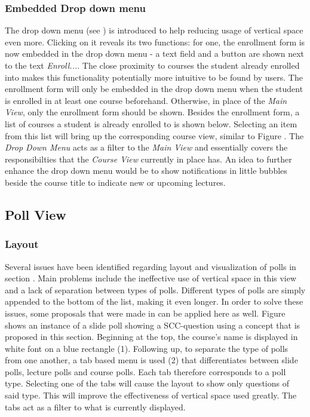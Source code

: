 \subsubsection{Embedded Drop down menu}
\label{section:con:proposals:dropdown}
The drop down menu (see \todogrf) is introduced to help reducing usage of vertical space even more. Clicking on it reveals its two functions: for one, the enrollment form is now embedded in the drop down menu - a text field and a button are shown next to the text \emph{Enroll...}. The close proximity to courses the student already enrolled into makes this functionality potentially more intuitive to be found by users. The enrollment form will only be embedded in the drop down menu when the student is enrolled in at least one course beforehand. Otherwise, in place of the \emph{Main View}, only the enrollment form should be shown. Besides the enrollment form, a list of courses a student is already enrolled to is shown below. Selecting an item from this list will bring up the corresponding course view, similar to Figure \todosct \todogrf.
The \emph{Drop Down Menu} acts as a filter to the \emph{Main View} and essentially covers the responsibilties that the \emph{Course View} currently in place has.
 An idea to further enhance the drop down menu would be to show notifications in little bubbles beside the course title to indicate new or upcoming lectures.


\subsection{Poll View}

\subsubsection{Layout}
Several issues have been identified regarding layout and visualization of polls in section \todosct. Main problems include the ineffective use of vertical space in this view and a lack of separation between types of polls. Different types of polls are simply appended to the bottom of the list, making it even longer. In order to solve these issues, some proposals that were made in \todosct can be applied here as well.  Figure \todosct shows an instance of a slide poll showing a SCC-question using a concept that is proposed in this section.
Beginning at the top, the course's name is displayed in white font on a blue rectangle (1). Following up, to separate the type of polls from one another, a tab based menu is used (2) that differentiates between slide polls, lecture polls and course polls. Each tab therefore corresponds to a poll type. Selecting one of the tabs will cause the layout to show only questions of said type. This will improve the effectiveness of vertical space used greatly. The tabs act as a filter to what is currently displayed.

